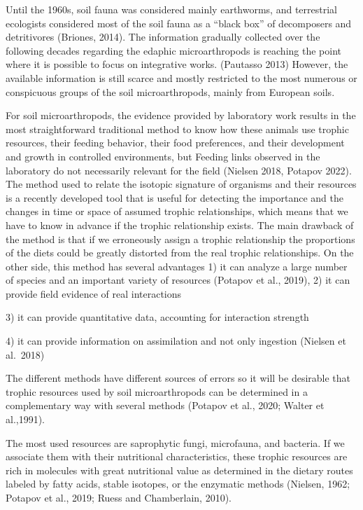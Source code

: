 \documentclass[11pt]{article}
\begin{document}
Until the 1960s, soil fauna was considered mainly earthworms, and
terrestrial ecologists considered most of the soil fauna as a ``black
box'' of decomposers and detritivores (Briones, 2014). The information
gradually collected over the following decades regarding the edaphic
microarthropods is reaching the point where it is possible to focus on
integrative works. (Pautasso 2013) However, the available information is
still scarce and mostly restricted to the most numerous or conspicuous
groups of the soil microarthropods, mainly from European soils.

For soil microarthropods, the evidence provided by laboratory work
results in the most straightforward traditional method to know how these
animals use trophic resources, their feeding behavior, their food
preferences, and their development and growth in controlled
environments, but Feeding links observed in the laboratory do not
necessarily relevant for the field (Nielsen 2018, Potapov 2022). The
method used to relate the isotopic signature of organisms and their
resources is a recently developed tool that is useful for detecting the
importance and the changes in time or space of assumed trophic
relationships, which means that we have to know in advance if the
trophic relationship exists. The main drawback of the method is that if
we erroneously assign a trophic relationship the proportions of the
diets could be greatly distorted from the real trophic relationships. On
the other side, this method has several advantages 1) it can analyze a
large number of species and an important variety of resources (Potapov
et al., 2019), 2) it can provide field evidence of real interactions

3) it can provide quantitative data, accounting for interaction strength

4) it can provide information on assimilation and not only ingestion
(Nielsen et al.~2018)

The different methods have different sources of errors so it will be
desirable that trophic resources used by soil microarthropods can be
determined in a complementary way with several methods (Potapov et al.,
2020; Walter et al.,1991).

The most used resources are saprophytic fungi, microfauna, and bacteria.
If we associate them with their nutritional characteristics, these
trophic resources are rich in molecules with great nutritional value as
determined in the dietary routes labeled by fatty acids, stable
isotopes, or the enzymatic methods (Nielsen, 1962; Potapov et al., 2019;
Ruess and Chamberlain, 2010).
\end{document}
